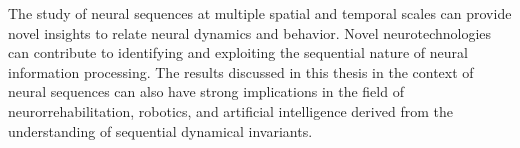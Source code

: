 The study of neural sequences at multiple spatial and temporal scales can provide novel insights to relate neural dynamics and behavior. Novel neurotechnologies can contribute to identifying and exploiting the sequential nature of neural information processing. The results discussed in this thesis in the context of neural sequences can also have strong implications in the field of neurorrehabilitation, robotics, and artificial intelligence derived from the understanding of sequential dynamical invariants. 




